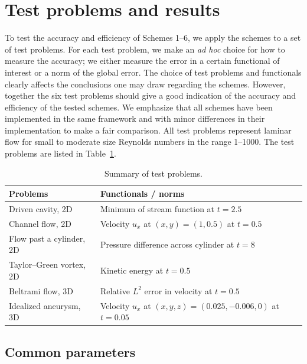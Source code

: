 \section{Test problems and results}

To test the accuracy and efficiency of Schemes 1--6, we apply the
schemes to a set of test problems. For each test problem, we make an
\emph{ad hoc} choice for how to measure the accuracy; we either
measure the error in a certain functional of interest or a norm of the
global error.  The choice of test problems and functionals clearly
affects the conclusions one may draw regarding the schemes. However,
together the six test problems should give a good indication of the
accuracy and efficiency of the tested schemes. We emphasize that all
schemes have been implemented in the same framework and with minor
differences in their implementation to make a fair comparison. All
test problems represent laminar flow for small to moderate size
Reynolds numbers in the range 1--1000. The test problems are listed in
Table~\ref{tab:problems}.

\begin{table}
  \center
    \begin{tabular}{ll}
      \hline
      Problems & Functionals / norms \\
      \hline
      Driven cavity, 2D        & Minimum of stream function at $t = 2.5$ \\
      Channel flow, 2D         & Velocity $u_x$ at $(x, y) = (1, 0.5)$ at $t = 0.5$ \\
      Flow past a cylinder, 2D & Pressure difference across cylinder at $t = 8$ \\
      Taylor--Green vortex, 2D & Kinetic energy at $t = 0.5$ \\
      Beltrami flow, 3D        & Relative $L^2$ error in velocity at $t = 0.5$ \\
      Idealized aneurysm, 3D   & Velocity $u_x$ at $(x, y, z) = (0.025, -0.006, 0)$ at $t = 0.05$ \\
      \hline
    \end{tabular}
  \caption{Summary of test problems.}
  \label{tab:problems}
\end{table}

\subsection{Common parameters}

